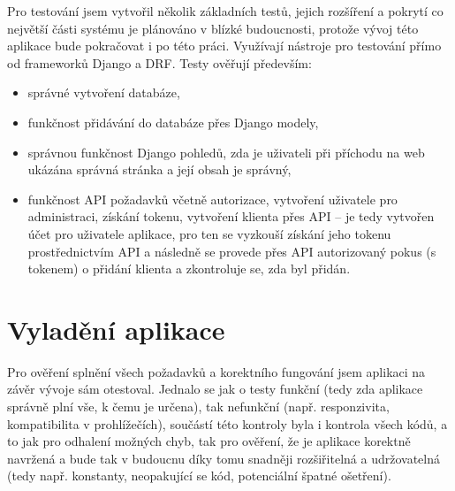     Pro testování jsem vytvořil několik základních testů, jejich rozšíření a pokrytí co největší části systému je plánováno v blízké budoucnosti, protože vývoj této aplikace bude pokračovat i po této práci. Využívají nástroje pro testování přímo od frameworků Django a DRF. Testy ověřují především:
        \begin{itemize}
            \item správné vytvoření databáze,
            \item funkčnost přidávání do databáze přes Django modely,
            \item správnou funkčnost Django pohledů, zda je uživateli při příchodu na web ukázána správná stránka a její obsah je správný,
            \item funkčnost API požadavků včetně autorizace, vytvoření uživatele pro administraci, získání tokenu, vytvoření klienta přes API -- je tedy vytvořen účet pro uživatele aplikace, pro ten se vyzkouší získání jeho tokenu prostřednictvím API a následně se provede přes API autorizovaný pokus (s tokenem) o přidání klienta a zkontroluje se, zda byl přidán.
        \end{itemize}

    \section{Vyladění aplikace}
    Pro ověření splnění všech požadavků a korektního fungování jsem aplikaci na závěr vývoje sám otestoval. Jednalo se jak o testy funkční (tedy zda aplikace správně plní vše, k čemu je určena), tak nefunkční (např. responzivita, kompatibilita v prohlížečích), součástí této kontroly byla i kontrola všech kódů, a to jak pro odhalení možných chyb, tak pro ověření, že je aplikace korektně navržená a bude tak v budoucnu díky tomu snadněji rozšiřitelná a udržovatelná (tedy např. konstanty, neopakující se kód, potenciální špatné ošetření).
    
